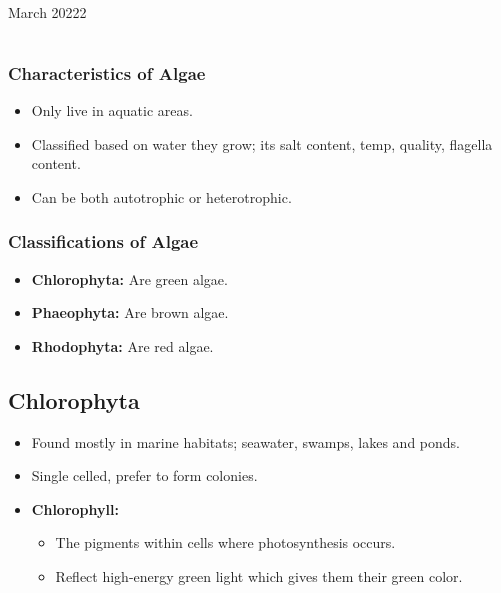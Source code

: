 \documentclass[12pt,oneside]{book} %
\begin{document}
	\renewcommand*{\term}{Term 2} %
	\renewcommand*{\coursecode}{MCR3U} %
	\renewcommand*{\coursename}{Course Name} %
	\renewcommand*{\thelecnum}{4} %
	\renewcommand*{\profname}{Prof Name} %
	\renewcommand*{\colink}{http://www.student.math.uwaterloo.ca/~c2kent} %
	\clearpage
	\pagestyle{classlecture}
\begin{lec}{March 20222}
	\chapter{\chapname\chaplec}

  \subsection*{Characteristics of Algae}

  \begin{itemize}
    \item Only live in aquatic areas.
    \item Classified based on water they grow; its salt content, temp, quality, flagella content.
    \item Can be both autotrophic or heterotrophic.
  \end{itemize}

  \subsection*{Classifications of Algae}
  \begin{itemize}
    \item \textbf{Chlorophyta:} Are green algae.
    \item \textbf{Phaeophyta:} Are brown algae.
    \item \textbf{Rhodophyta:} Are red algae.
  \end{itemize}

  \section*{Chlorophyta}
  \begin{itemize}
    \item Found mostly in marine habitats; seawater, swamps, lakes and ponds.
    \item Single celled, prefer to form colonies.
    \item \textbf{Chlorophyll:} 
       \begin{itemize}
         \item The pigments within cells where photosynthesis occurs.
         \item Reflect high-energy green light which gives them their green color.
       \end{itemize}
  \end{itemize}



\end{lec}
\end{document}
